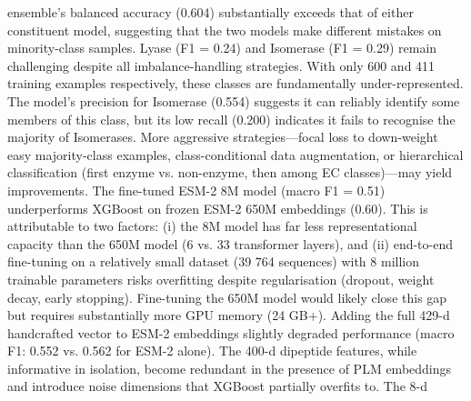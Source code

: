 {}ensemble's balanced accuracy (0.604) substantially exceeds that of either constituent model,\markdownRendererSoftLineBreak
{}suggesting that the two models make different mistakes on minority-class samples.\markdownRendererInterblockSeparator
{}
\markdownRendererSectionEnd \markdownRendererSectionBegin
{}\markdownRendererInterblockSeparator
{} Lyase (F1 = 0.24) and Isomerase (F1 = 0.29) remain\markdownRendererSoftLineBreak
{}challenging despite all imbalance-handling strategies. With only 600 and 411 training examples\markdownRendererSoftLineBreak
{}respectively, these classes are fundamentally under-represented. The model's precision for\markdownRendererSoftLineBreak
{}Isomerase (0.554) suggests it can reliably identify some members of this class, but its low\markdownRendererSoftLineBreak
{}recall (0.200) indicates it fails to recognise the majority of Isomerases. More aggressive\markdownRendererSoftLineBreak
{}strategies—focal loss to down-weight easy majority-class examples, class-conditional data\markdownRendererSoftLineBreak
{}augmentation, or hierarchical classification (first enzyme vs. non-enzyme, then among EC\markdownRendererSoftLineBreak
{}classes)—may yield improvements.\markdownRendererParagraphSeparator
{} The fine-tuned ESM-2 8M model (macro F1 = 0.51) underperforms XGBoost\markdownRendererSoftLineBreak
{}on frozen ESM-2 650M embeddings (0.60). This is attributable to two factors: (i) the 8M\markdownRendererSoftLineBreak
{}model has far less representational capacity than the 650M model (6 vs. 33 transformer\markdownRendererSoftLineBreak
{}layers), and (ii) end-to-end fine-tuning on a relatively small dataset (39 764 sequences)\markdownRendererSoftLineBreak
{}with 8 million trainable parameters risks overfitting despite regularisation (dropout,\markdownRendererSoftLineBreak
{}weight decay, early stopping). Fine-tuning the 650M model would likely close this gap but\markdownRendererSoftLineBreak
{}requires substantially more GPU memory (24 GB+).\markdownRendererParagraphSeparator
{} Adding the full 429-d handcrafted vector to ESM-2 embeddings\markdownRendererSoftLineBreak
{}slightly degraded performance (macro F1: 0.552 vs. 0.562 for ESM-2 alone). The 400-d\markdownRendererSoftLineBreak
{}dipeptide features, while informative in isolation, become redundant in the presence of PLM\markdownRendererSoftLineBreak
{}embeddings and introduce noise dimensions that XGBoost partially overfits to. The 8-d\markdownRendererSoftLineBreak
